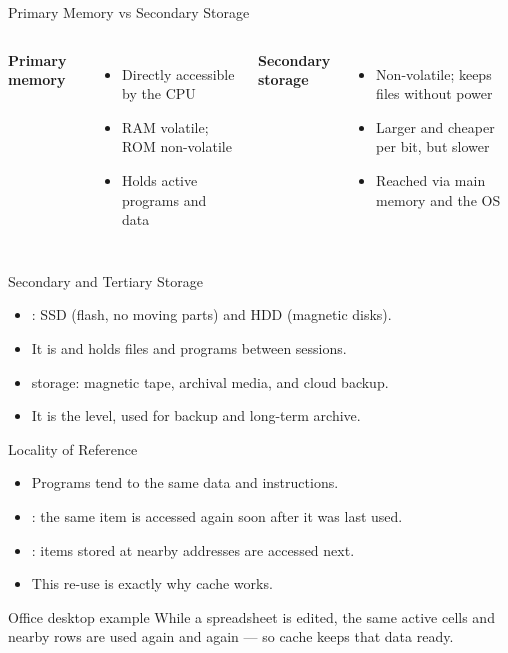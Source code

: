 \documentclass[aspectratio=169]{beamer}
\begin{document}
\begin{frame}{Primary Memory vs Secondary Storage}
  \begin{columns}[T]
      \textbf{Primary memory}
      \begin{itemize}
        \item Directly accessible by the CPU
        \item RAM volatile; ROM non-volatile
        \item Holds active programs and data
      \end{itemize}
      \textbf{Secondary storage}
      \begin{itemize}
        \item Non-volatile; keeps files without power
        \item Larger and cheaper per bit, but slower
        \item Reached via main memory and the OS
      \end{itemize}
  \end{columns}
  \vspace{0.3cm}
\end{frame}

\begin{frame}{Secondary and Tertiary Storage}
  \begin{itemize}
    \item {}: SSD (flash, no moving parts) and HDD
      (magnetic disks).
    \item It is  and holds files and programs between
      sessions.
    \item {} storage: magnetic tape, archival media,
      and cloud backup.
    \item It is the  level, used for backup and
      long-term archive.
  \end{itemize}
\end{frame}

\begin{frame}{Locality of Reference}
  \begin{itemize}
    \item Programs tend to  the same data and instructions.
    \item {}: the same item is accessed again soon
      after it was last used.
    \item {}: items stored at nearby addresses are
      accessed next.
    \item This re-use is exactly why cache works.
  \end{itemize}
  \begin{block}{Office desktop example}
    While a spreadsheet is edited, the same active cells and nearby rows
    are used again and again --- so cache keeps that data ready.
  \end{block}
\end{frame}
\end{document}
